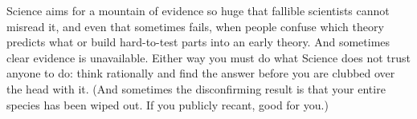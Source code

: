 Science aims for a mountain of evidence so huge that fallible scientists cannot misread it, and even that sometimes fails, when people confuse which theory predicts what or build hard-to-test parts into an early theory. And sometimes clear evidence is unavailable. Either way you must do what Science does not trust anyone to do: think rationally and find the answer before you are clubbed over the head with it. (And sometimes the disconfirming result is that your entire species has been wiped out. If you publicly recant, good for you.) 
